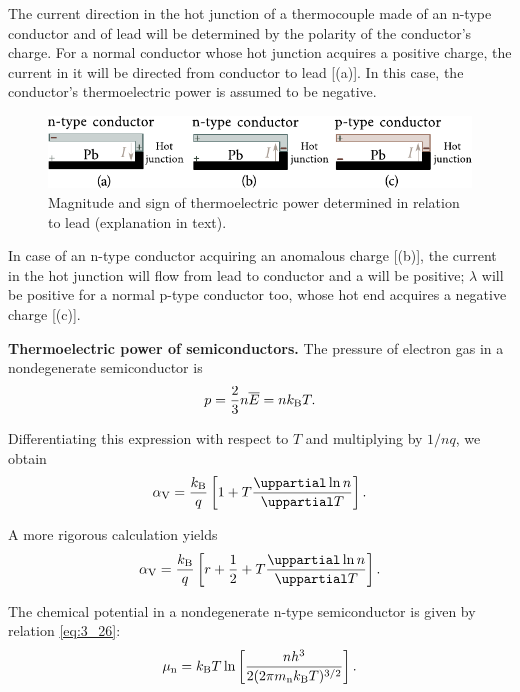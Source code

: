 The current direction in the hot junction of a thermocouple made of an n-type conductor and of lead will be determined by the polarity of the conductor's charge. For a normal conductor whose hot junction acquires a positive charge, the current in it will be directed from conductor to lead [(a)]. In this case, the conductor's thermoelectric power is assumed to be negative.

\begin{figure}[t]
	\begin{center}
		\includegraphics[scale=1]{figures/ch_09/fig_9_2.pdf}
		\caption[]{Magnitude and sign of thermoelectric power determined in relation to lead (explanation in text).}
		\label{fig:9_2}
	\end{center}
	\vspace{-0.9cm}
\end{figure}

In case of an n-type conductor acquiring an anomalous charge [(b)], the current in the hot junction will flow from lead to conductor and a will be positive; $\lambda$ will be positive for a normal p-type conductor too, whose hot end acquires a negative charge [(c)].

\textbf{Thermoelectric power of semiconductors.} The pressure of electron gas in a nondegenerate semiconductor is
\begin{equation*}
    p = \frac{2}{3} n \overline{E} = n k_{\text{B}}T.
\end{equation*}

\noindent
Differentiating this expression with respect to $T$ and multiplying by $1/nq$, we obtain
\begin{equation}\label{eq:9_14}
    \ab{\alpha}{V} = \frac{\ab{k}{B}}{q} \bracket{1 + T \diffpartial{\ln{n}}{T}}.
\end{equation}

\noindent
A more rigorous calculation yields
\begin{equation}\label{eq:9_15}
    \ab{\alpha}{V} = \frac{\ab{k}{B}}{q} \bracket{r + \frac{1}{2} + T \diffpartial{\ln{n}}{T}}.
\end{equation}

\noindent
The chemical potential in a nondegenerate n-type semiconductor is given by relation \eqref{eq:3_26}:
\begin{equation*}
    \mu_{\text{n}} = k_{\text{B}} T \ln\left[\frac{nh^3}{2(2\pi m_{\text{n}}k_{\text{B}}T)^{3/2}}\right].
\end{equation*}

